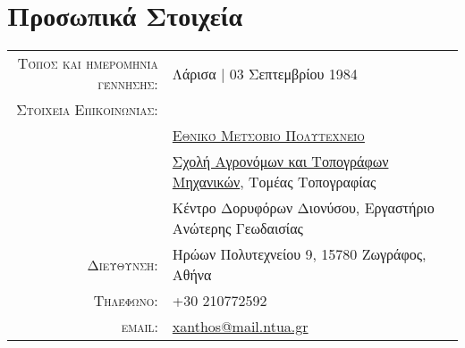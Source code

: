 \documentclass[a4paper,10pt]{article} %
\begin{document}


\par{\bigskip\par} %

\section{Προσωπικά Στοιχεία}

\begin{tabular}{rl}
  \textsc{Τόπος και ημερομηνία γέννησης:} & Λάρισα | 03 Σεπτεμβρίου 1984\\
  \textsc{Στοιχεία Επικοινωνίας:} \\
  & \textsc{\href{http://www.ntua.gr/}{Εθνικό Μετσόβιο Πολυτεχνείο}} \\
  & \href{http://www.survey.ntua.gr/}{Σχολή Αγρονόμων και Τοπογράφων Μηχανικών}, Τομέας Τοπογραφίας\\
  & Κέντρο Δορυφόρων Διονύσου, Εργαστήριο Ανώτερης Γεωδαισίας \\
  \textsc{Διεύθυνση:} & Ηρώων Πολυτεχνείου 9, 15780 Ζωγράφος, Αθήνα \\
  \textsc{Τηλέφωνο:} & +30 210772592\\
  \textsc{email:} & \href{mailto:xanthos@mail.ntua.gr}{xanthos@mail.ntua.gr}
\end{tabular}
\medskip

\end{document}
